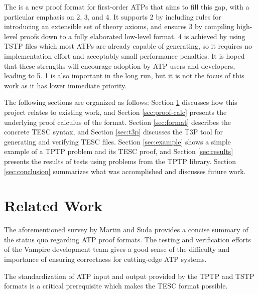 \documentclass[12pt]{article}
\begin{document}
The \href{https://github.com/skbaek/tesc}{\color{blue}{Theory Extensible Sequent Calculus (TESC)}} 
is a new proof format for first-order ATPs that aims to fill this gap, with a particular emphasis on 2, 3, and 4. 
It supports 2 by including rules for introducing an extensible set of theory axioms, 
and ensures 3 by compiling high-level proofs down to a fully elaborated low-level format. 
4 is achieved by using TSTP files which most ATPs are already capable of generating, 
so it requires no implementation effort and acceptably small performance penalties.
It is hoped that these strengths will encourage adoption by ATP users and developers, leading to 5. 
1 is also important in the long run, but it is not the focus of this work as it has lower immediate priority.

% 
The following sections are organized as follows: 
Section \ref{sec:rel-work} discusses how this project relates to existing work, and
Section \ref{sec:proof-calc} presents the underlying proof calculus of the format.
Section \ref{sec:format} describes the concrete TESC syntax, and 
Section \ref{sec:t3p} discusses the T3P tool for generating and verifying TESC files. 
Section \ref{sec:example} shows a simple example of a TPTP problem and its TESC proof, and
Section \ref{sec:results} presents the results of tests using problems from the TPTP library.
Section \ref{sec:conclusion} summarizes what was accomplished and discusses future work.


\section{Related Work} \label{sec:rel-work} 

The aforementioned survey by Martin and Suda \cite{reger2017checkable} provides a concise summary 
of the status quo regarding ATP proof formats. The testing and verification efforts of the Vampire 
development team \cite{reger2017testing} gives a good sense of the difficulty and importance of 
ensuring correctness for cutting-edge ATP systems.

The standardization of ATP input and output provided by the TPTP \cite{sutcliffe2009tptp} and TSTP 
\cite{sutcliffe2004tstp} formats is a critical prerequisite which makes the TESC format possible. 
\end{document}

